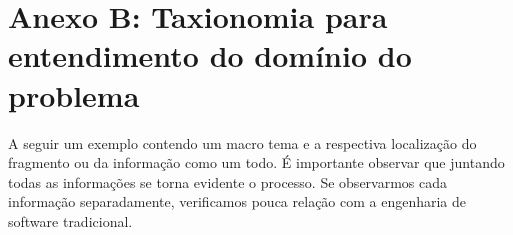 % 
% 
% 
% 

\section{Anexo B: Taxionomia para entendimento do domínio do problema} \label{sec:anexob}

A seguir um exemplo contendo um macro tema e a respectiva localização do fragmento ou da informação como um todo. É importante observar que juntando todas as informações se torna evidente o processo. Se observarmos cada informação separadamente, verificamos pouca relação com a engenharia de software tradicional.

